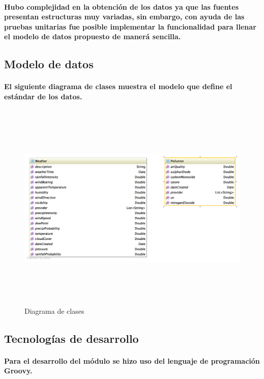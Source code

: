     \paragraph{Hubo complejidad en la obtención de los datos ya que las fuentes presentan estructuras muy variadas, sin embargo, con ayuda de las pruebas unitarias fue posible implementar la funcionalidad para llenar el modelo de datos propuesto de manerá sencilla.}
  
  \newpage
  \subsection{Modelo de datos} 
  \paragraph{El siguiente diagrama de clases muestra el modelo que define el estándar de los datos.}
    \begin{figure}[b!]
    \begin{center}
      \includegraphics[width=14cm,height=10cm]{./images/SmartOwl_ClassDiagram}
      \caption{Diagrama de clases}
    \end{center}
    \end{figure}
  \newpage

    

  \subsection{Tecnologías de desarrollo}
  \paragraph{Para el desarrollo del módulo se hizo uso del lenguaje de programación Groovy.} 

